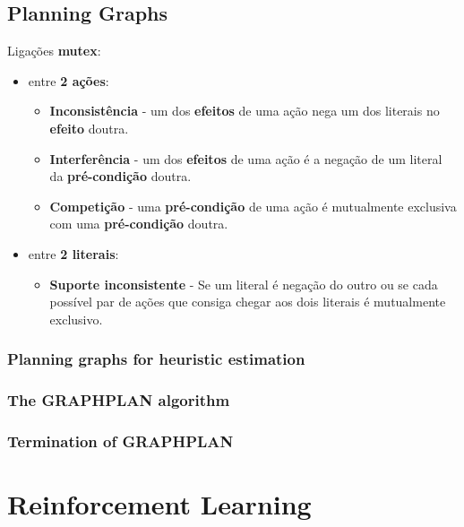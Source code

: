 \documentclass[11pt]{article}
\begin{document}
\subsection{Planning Graphs}

Ligações \textbf{mutex}:
\begin{itemize}[topsep=4pt,itemsep=0pt]
    \item entre \textbf{2 ações}:
    \begin{itemize}[topsep=0pt]
        \item \textbf{Inconsistência} - um dos \textbf{efeitos} de uma ação nega um dos literais no \textbf{efeito} doutra.
        \item \textbf{Interferência} - um dos \textbf{efeitos} de uma ação é a negação de um literal da \textbf{pré-condição} doutra.
        \item \textbf{Competição} - uma \textbf{pré-condição} de uma ação é mutualmente exclusiva com uma \textbf{pré-condição} doutra.
    \end{itemize}
    \item entre \textbf{2 literais}:
    \begin{itemize}[topsep=0pt]
        \item \textbf{Suporte inconsistente} - Se um literal é negação do outro ou se cada possível par de ações que consiga chegar aos dois literais é mutualmente exclusivo.
    \end{itemize}
\end{itemize}

\subsubsection{Planning graphs for heuristic estimation}

\subsubsection{The GRAPHPLAN algorithm}

\subsubsection{Termination of GRAPHPLAN}

\newpage
\setcounter{section}{20}
\section{Reinforcement Learning}

\end{document}
